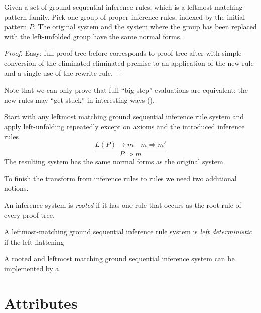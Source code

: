 \documentclass[letterpaper,11pt]{article}
\begin{document}
\begin{proposition}
  Given a set of ground sequential inference rules, which is a leftmost-matching pattern
  family. Pick one group of proper inference rules, indexed by the initial pattern $P$. The original
  system and the system where the group has been replaced with the left-unfolded group have the same
  normal forms.
\end{proposition}
\begin{proof}
  Easy: full proof tree before corresponds to proof tree after with simple conversion of the
  eliminated eliminated premise to an application of the new rule and a single use of the rewrite
  rule.
\end{proof}

Note that we can only prove that full ``big-step'' evaluations are equivalent: the new rules may
``get stuck'' in interesting ways ().

\begin{lemma}
  Start with any leftmost matching ground sequential inference rule system and apply left-unfolding
  repeatedly except on axioms and the introduced inference rules
  \begin{displaymath}
    \dfrac{ L(P) → m \quad m ⇒ m' }{ P ⇒ m }
  \end{displaymath}
  The resulting system has the same normal forms as the original system.
\end{lemma}

To finish the transform from inference rules to \HAX rules we need two additional notions.

\begin{definition}
  An inference system is \emph{rooted} if it has one rule that occurs as the root rule of every
  proof tree.
\end{definition}

\begin{definition}
  A leftmost-matching ground sequential inference rule system is \emph{left deterministic} if the
  left-flattening 
\end{definition}

\begin{theorem}
  A rooted and leftmost matching ground sequential inference system can be implemented by a 
\end{theorem}

\section{Attributes}
\end{document}

